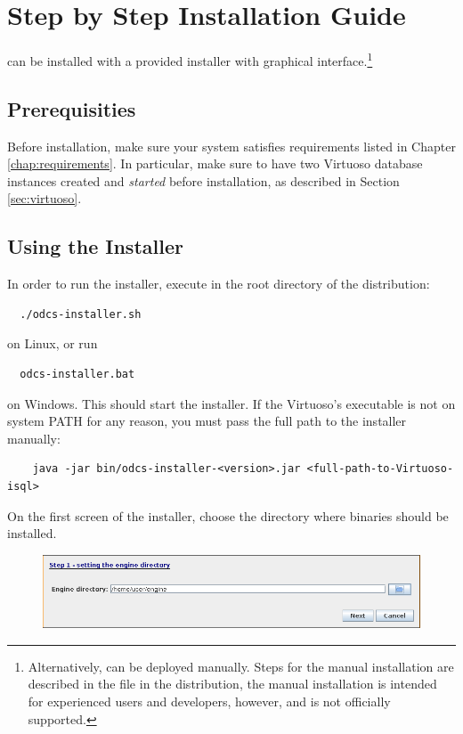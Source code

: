 \chapter{Step by Step Installation Guide}
\odcs can be installed with a provided installer with graphical interface.\footnote{Alternatively, \odcs can be deployed manually. Steps for the manual installation are described in the  file in the distribution, the manual installation is intended for experienced users and developers, however, and is not officially supported.}

\section{Prerequisities}
Before installation, make sure your system satisfies requirements listed in Chapter \ref{chap:requirements}. In particular, make sure to have two Virtuoso database instances created and \textit{started} before installation, as described in Section \ref{sec:virtuoso}.

\section{Using the Installer}
In order to run the installer, execute in the root directory of the distribution:
\begin{verbatim}
  ./odcs-installer.sh
\end{verbatim}
on Linux, or run
\begin{verbatim}
  odcs-installer.bat
\end{verbatim}
on Windows. This should start the installer. If the Virtuoso's  executable is not on system PATH for any reason, you must pass the full path to the installer manually:
\begin{verbatim}
    java -jar bin/odcs-installer-<version>.jar <full-path-to-Virtuoso-isql>
\end{verbatim}

On the first screen of the installer, choose the directory where \odcs binaries should be installed.

\begin{figure}[!h]
    \centering
    \includegraphics[width=\textwidth]{images/install-step-01.png}
\end{figure}

